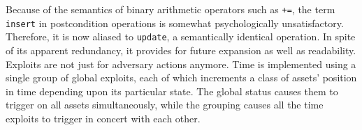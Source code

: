 Because of the semantics of binary arithmetic operators such as \texttt{+=},
the term \texttt{insert} in postcondition operations is somewhat psychologically
unsatisfactory. Therefore, it is now aliased to \texttt{update}, a semantically
identical operation. In spite of its apparent redundancy, it provides for
future expansion as well as readability.
Exploits are not just for adversary actions anymore. Time is implemented using
a single group of global exploits, each of which increments a class of assets'
position in time depending upon its particular state. The global status
causes them to trigger on all assets simultaneously, while the grouping causes
all the time exploits to trigger in concert with each other.


